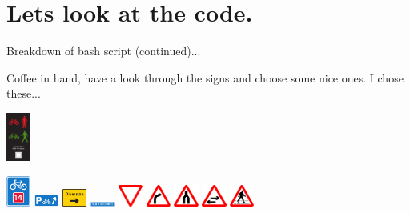 \section*{Lets look at the code.}
\setlength{\fboxsep}{0pt}
\begin{frame}{Breakdown of bash script (continued)...}
\parbox{\textwidth}{\small Coffee in hand, have a look through the signs and choose some nice ones. I chose these...}

\parbox[c]{0.07\textwidth}{%
\includegraphics[width=0.06\textwidth]{Motivation/Signs/4003.7}}%
\parbox[c]{0.93\textwidth}{\raggedright
\includegraphics[width=0.06\textwidth]{Motivation/Signs/2602.2}
\includegraphics[width=0.06\textwidth]{Motivation/Signs/2603}
\includegraphics[width=0.06\textwidth]{Motivation/Signs/2702}
\includegraphics[width=0.06\textwidth]{Motivation/Signs/2928}
\includegraphics[width=0.06\textwidth]{Motivation/Signs/501}
\includegraphics[width=0.06\textwidth]{Motivation/Signs/512}
\includegraphics[width=0.06\textwidth]{Motivation/Signs/520}
\includegraphics[width=0.06\textwidth]{Motivation/Signs/522}
\includegraphics[width=0.06\textwidth]{Motivation/Signs/544}
}
\end{frame}
